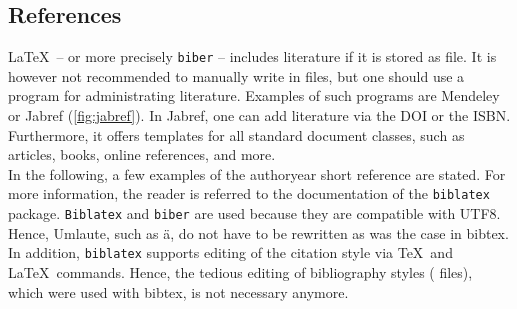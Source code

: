 \subsection{References}\label{subsec:references}
\LaTeX\ -- or more precisely \verb+biber+ -- includes literature if it is stored as  file. It is however not recommended to manually write in  files, but one should use a program for administrating literature. Examples of such programs are Mendeley or Jabref (\autoref{fig:jabref}). In Jabref, one can add literature via the DOI or the ISBN. Furthermore, it offers templates for all standard document classes, such as articles, books, online references, and more.\\
In the following, a few examples of the authoryear short reference are stated. For more information, the reader is referred to the documentation of the \verb+biblatex+ package. \verb+Biblatex+ and \verb+biber+ are used because they are compatible with UTF8. Hence, Umlaute, such as ä, do not have to be rewritten as was the case in bibtex. In addition, \verb+biblatex+ supports editing of the citation style via \TeX\ and \LaTeX\ commands. Hence, the tedious editing of bibliography styles ( files), which were used with bibtex, is not necessary anymore.

